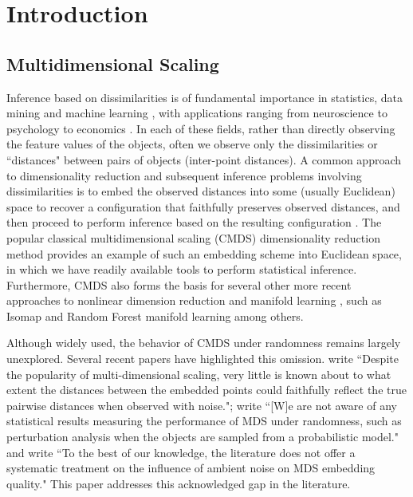 \chapter{Introduction}
\label{sec:intro}


\section{Multidimensional Scaling}
Inference based on dissimilarities is of fundamental importance in statistics, data mining and machine learning \cite{dissimilarityPatternRecog}, with applications ranging from neuroscience \cite{Vogelstein386} to psychology \cite{Carroll1970} to economics \cite{cmdsecon}. In each of these fields, rather than directly observing the feature values of the objects, often we observe only  the dissimilarities or ``distances" between pairs of objects (inter-point distances). A common approach to dimensionality reduction and subsequent inference problems involving dissimilarities is to embed the observed distances into some (usually Euclidean) space to recover a configuration that faithfully preserves observed distances, and then proceed to perform inference based on the resulting configuration \cite{Leeuw-Heiser, BGbook, Torgerson, Cox2008}. The popular classical multidimensional scaling 
(CMDS) dimensionality reduction method provides an example of such an embedding scheme into Euclidean space, in which we have readily available tools to perform statistical inference. Furthermore, CMDS also forms the basis for several other more recent approaches to nonlinear dimension reduction and manifold learning \cite{Scholkopf, ChenBuja}, such as Isomap \cite{Isomap} and Random Forest manifold learning \cite{CriminisiandShotton} among others. 

Although widely used, the behavior of CMDS under randomness remains largely unexplored. Several recent papers have highlighted this omission. \cite{DsquaredplusE} write ``Despite the popularity of multi-dimensional scaling, very little is known about to what extent the distances between the embedded points could faithfully reflect the true pairwise distances when observed with noise."; \cite{Fan} write ``[W]e are not aware of any statistical results measuring the performance of MDS under randomness, such as perturbation analysis when the objects are sampled from a probabilistic model." and \cite{Peterfreund&Gavish} write ``To the best of our knowledge, the literature does not offer a systematic treatment on the influence of ambient noise on MDS embedding quality." This paper addresses this acknowledged gap in the literature.

